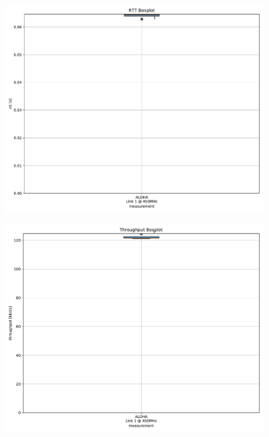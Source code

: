 \documentclass{article}
\begin{document}
\begin{figure}
	\includegraphics[width=\textwidth]{aloha_rb_high/boxplot/rtt_boxplot}
\end{figure}

\begin{figure}
	\includegraphics[width=\textwidth]{aloha_rb_high/boxplot/throughput_boxplot}
\end{figure}
\end{document}
